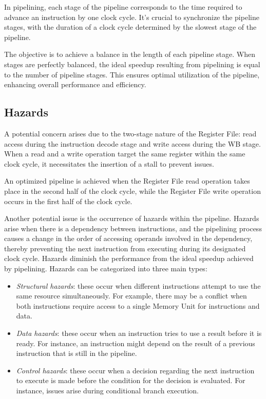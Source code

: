 In pipelining, each stage of the pipeline corresponds to the time required to advance an instruction by one clock cycle. 
It's crucial to synchronize the pipeline stages, with the duration of a clock cycle determined by the slowest stage of the pipeline.

The objective is to achieve a balance in the length of each pipeline stage. 
When stages are perfectly balanced, the ideal speedup resulting from pipelining is equal to the number of pipeline stages. 
This ensures optimal utilization of the pipeline, enhancing overall performance and efficiency.

\subsection{Hazards}
A potential concern arises due to the two-stage nature of the Register File: read access during the instruction decode stage and write access during the WB stage. 
When a read and a write operation target the same register within the same clock cycle, it necessitates the insertion of a stall to prevent issues.
\begin{definition}
    An optimized pipeline is achieved when the Register File read operation takes place in the second half of the clock cycle, while the Register File write operation occurs in the first half of the clock cycle.
\end{definition}
Another potential issue is the occurrence of hazards within the pipeline.
Hazards arise when there is a dependency between instructions, and the pipelining process causes a change in the order of accessing operands involved in the dependency, thereby preventing the next instruction from executing during its designated clock cycle.
Hazards diminish the performance from the ideal speedup achieved by pipelining. 
Hazards can be categorized into three main types:
\begin{itemize}
    \item \textit{Structural hazards}: these occur when different instructions attempt to use the same resource simultaneously.
        For example, there may be a conflict when both instructions require access to a single Memory Unit for instructions and data.
    \item \textit{Data hazards}: these occur when an instruction tries to use a result before it is ready. 
    For instance, an instruction might depend on the result of a previous instruction that is still in the pipeline.
    \item \textit{Control hazards}: these occur when a decision regarding the next instruction to execute is made before the condition for the decision is evaluated. 
        For instance, issues arise during conditional branch execution.
\end{itemize}

